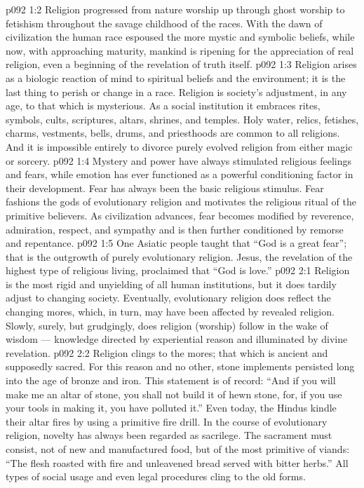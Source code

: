 \vs p092 1:2 Religion progressed from nature worship up through ghost worship to fetishism throughout the savage childhood of the races. With the dawn of civilization the human race espoused the more mystic and symbolic beliefs, while now, with approaching maturity, mankind is ripening for the appreciation of real religion, even a beginning of the revelation of truth itself.
\vs p092 1:3 Religion arises as a biologic reaction of mind to spiritual beliefs and the environment; it is the last thing to perish or change in a race. Religion is society’s adjustment, in any age, to that which is mysterious. As a social institution it embraces rites, symbols, cults, scriptures, altars, shrines, and temples. Holy water, relics, fetishes, charms, vestments, bells, drums, and priesthoods are common to all religions. And it is impossible entirely to divorce purely evolved religion from either magic or sorcery.
\vs p092 1:4 Mystery and power have always stimulated religious feelings and fears, while emotion has ever functioned as a powerful conditioning factor in their development. Fear has always been the basic religious stimulus. Fear fashions the gods of evolutionary religion and motivates the religious ritual of the primitive believers. As civilization advances, fear becomes modified by reverence, admiration, respect, and sympathy and is then further conditioned by remorse and repentance.
\vs p092 1:5 One Asiatic people taught that “God is a great fear”; that is the outgrowth of purely evolutionary religion. Jesus, the revelation of the highest type of religious living, proclaimed that “God is love.”
\vs p092 2:1 Religion is the most rigid and unyielding of all human institutions, but it does tardily adjust to changing society. Eventually, evolutionary religion does reflect the changing mores, which, in turn, may have been affected by revealed religion. Slowly, surely, but grudgingly, does religion (worship) follow in the wake of wisdom --- knowledge directed by experiential reason and illuminated by divine revelation.
\vs p092 2:2 Religion clings to the mores; that which  is ancient and supposedly sacred. For this reason and no other, stone implements persisted long into the age of bronze and iron. This statement is of record: “And if you will make me an altar of stone, you shall not build it of hewn stone, for, if you use your tools in making it, you have polluted it.” Even today, the Hindus kindle their altar fires by using a primitive fire drill. In the course of evolutionary religion, novelty has always been regarded as sacrilege. The sacrament must consist, not of new and manufactured food, but of the most primitive of viands: “The flesh roasted with fire and unleavened bread served with bitter herbs.” All types of social usage and even legal procedures cling to the old forms.
